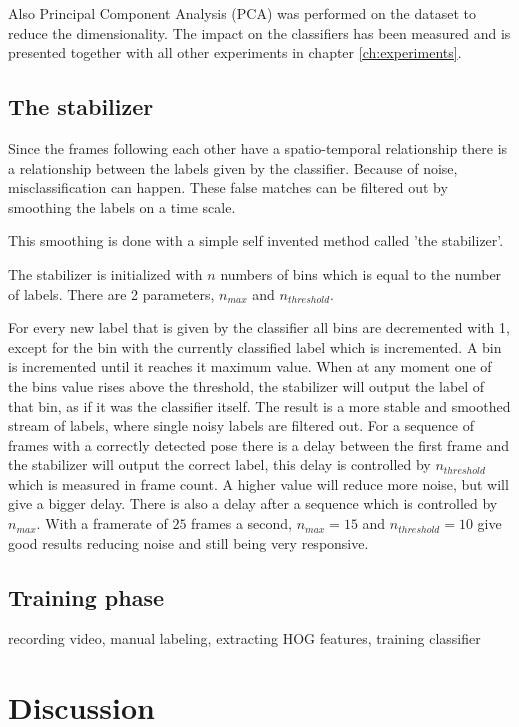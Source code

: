 Also Principal Component Analysis (PCA) was performed on the dataset to reduce the dimensionality. The impact on the classifiers has been measured and is presented together with all other experiments in chapter \ref{ch:experiments}.

\subsection*{The stabilizer}
Since the frames following each other have a spatio-temporal relationship there is a relationship between the labels given by the classifier. Because of noise, misclassification can happen. These false matches can be filtered out by smoothing the labels on a time scale.

This smoothing is done with a simple self invented method called 'the stabilizer'. 

The stabilizer is initialized with $n$ numbers of bins which is equal to the number of labels. There are 2 parameters, $n_{max}$ and $n_{threshold}$.

For every new label that is given by the classifier all bins are decremented with 1, except for the bin with the currently classified label which is incremented. A bin is incremented until it reaches it maximum value. When at any moment one of the bins value rises above the threshold, the stabilizer will output the label of that bin, as if it was the classifier itself. The result is a more stable and smoothed stream of labels, where single noisy labels are filtered out. For a sequence of frames with a correctly detected pose there is a delay between the first frame and the stabilizer will output the correct label, this delay is controlled by $n_{threshold}$ which is measured in frame count. A higher value will reduce more noise, but will give a bigger delay. There is also a delay after a sequence which is controlled by $n_{max}$. With a framerate of $25$ frames a second, $n_{max} = 15$ and $n_{threshold} = 10$ give good results reducing noise and still being very responsive. 

\subsection*{Training phase}
recording video, manual labeling, extracting HOG features, training classifier

\section{Discussion}
